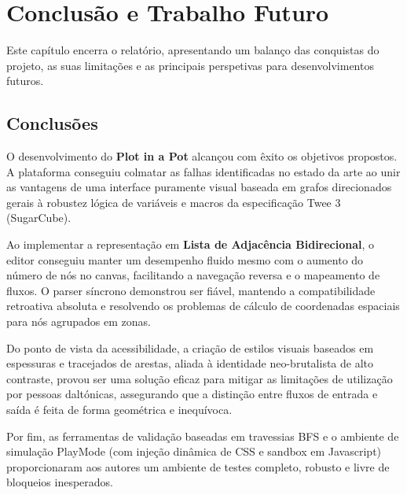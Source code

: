 \chapter{Conclusão e Trabalho Futuro}
\label{cp:conclusao}

Este capítulo encerra o relatório, apresentando um balanço das conquistas do projeto, as suas limitações e as principais perspetivas para desenvolvimentos futuros.

\section{Conclusões}
O desenvolvimento do \textbf{Plot in a Pot} alcançou com êxito os objetivos propostos. A plataforma conseguiu colmatar as falhas identificadas no estado da arte ao unir as vantagens de uma interface puramente visual baseada em grafos direcionados gerais à robustez lógica de variáveis e macros da especificação Twee 3 (SugarCube).

Ao implementar a representação em \textbf{Lista de Adjacência Bidirecional}, o editor conseguiu manter um desempenho fluido mesmo com o aumento do número de nós no canvas, facilitando a navegação reversa e o mapeamento de fluxos. O parser síncrono demonstrou ser fiável, mantendo a compatibilidade retroativa absoluta e resolvendo os problemas de cálculo de coordenadas espaciais para nós agrupados em zonas.

Do ponto de vista da acessibilidade, a criação de estilos visuais baseados em espessuras e tracejados de arestas, aliada à identidade neo-brutalista de alto contraste, provou ser uma solução eficaz para mitigar as limitações de utilização por pessoas daltónicas, assegurando que a distinção entre fluxos de entrada e saída é feita de forma geométrica e inequívoca.

Por fim, as ferramentas de validação baseadas em travessias BFS e o ambiente de simulação PlayMode (com injeção dinâmica de CSS e sandbox em Javascript) proporcionaram aos autores um ambiente de testes completo, robusto e livre de bloqueios inesperados.

